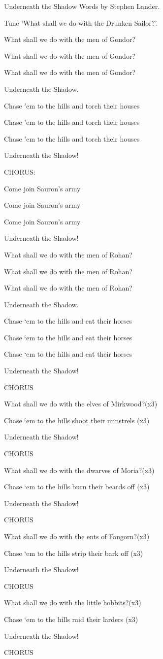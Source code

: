 Underneath the Shadow
Words by Stephen Lander.

Tune ’What shall we do with the Drunken Sailor?’.


What shall we do with the men of Gondor?

What shall we do with the men of Gondor?

What shall we do with the men of Gondor?

Underneath the Shadow.


Chase ’em to the hills and torch their houses

Chase ’em to the hills and torch their houses

Chase ’em to the hills and torch their houses

Underneath the Shadow!


CHORUS:

Come join Sauron’s army

Come join Sauron’s army

Come join Sauron’s army

Underneath the Shadow!


What shall we do with the men of Rohan?

What shall we do with the men of Rohan?

What shall we do with the men of Rohan?

Underneath the Shadow.


Chase ‘em to the hills and eat their horses

Chase ‘em to the hills and eat their horses

Chase ‘em to the hills and eat their horses

Underneath the Shadow!


CHORUS


What shall we do with the elves of Mirkwood?(x3)

Chase ‘em to the hills shoot their minstrels (x3)

Underneath the Shadow!


CHORUS


What shall we do with the dwarves of Moria?(x3)

Chase ‘em to the hills burn their beards off (x3)

Underneath the Shadow!


CHORUS


What shall we do with the ents of Fangorn?(x3)

Chase ‘em to the hills strip their bark off (x3)

Underneath the Shadow!


CHORUS


What shall we do with the little hobbits?(x3)

Chase ‘em to the hills raid their larders (x3)

Underneath the Shadow!


CHORUS

